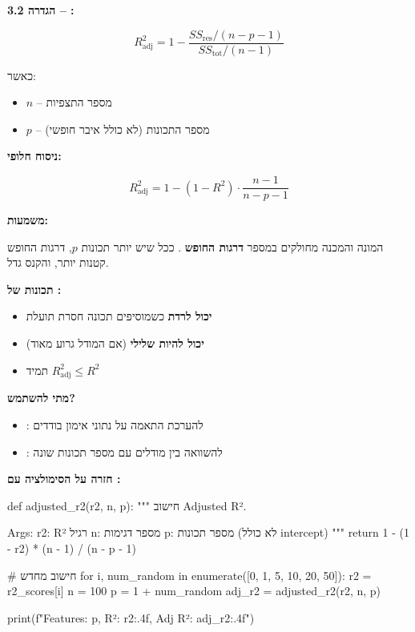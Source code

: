 \textbf{הגדרה \num{3.2} – :}

\begin{equation}
R^2_{\text{adj}} = 1 - \frac{SS_{\text{res}} / (n - p - 1)}{SS_{\text{tot}} / (n - 1)}
\end{equation}

כאשר:
\begin{itemize}
\item $n$ – מספר התצפיות
\item $p$ – מספר התכונות (לא כולל איבר חופשי)
\end{itemize}

\textbf{ניסוח חלופי:}

\begin{equation}
R^2_{\text{adj}} = 1 - (1 - R^2) \cdot \frac{n - 1}{n - p - 1}
\end{equation}

\textbf{משמעות:}

המונה והמכנה מחולקים במספר \textbf{דרגות החופש} . ככל שיש יותר תכונות $p$, דרגות החופש קטנות יותר, והקנס גדל.

\textbf{תכונות של :}

\begin{itemize}
\item \textbf{יכול לרדת} כשמוסיפים תכונה חסרת תועלת
\item \textbf{יכול להיות שלילי} (אם המודל גרוע מאוד)
\item תמיד $R^2_{\text{adj}} \leq R^2$
\end{itemize}

\textbf{מתי להשתמש?}

\begin{itemize}
\item \textbf{\Rsquared{}}: להערכת התאמה על נתוני אימון בודדים
\item \textbf{}: להשוואה בין מודלים עם מספר תכונות שונה
\end{itemize}

\textbf{חזרה על הסימולציה עם :}

\begin{pythonbox}
def adjusted_r2(r2, n, p):
    """
    חישוב Adjusted R².
    
    Args:
        r2: R² רגיל
        n: מספר דגימות
        p: מספר תכונות (לא כולל intercept)
    """
    return 1 - (1 - r2) * (n - 1) / (n - p - 1)

# חישוב מחדש
for i, num_random in enumerate([0, 1, 5, 10, 20, 50]):
    r2 = r2_scores[i]
    n = 100
    p = 1 + num_random
    adj_r2 = adjusted_r2(r2, n, p)
    
    print(f"Features: {p}, R²: {r2:.4f}, Adj R²: {adj_r2:.4f}")
\end{pythonbox}

